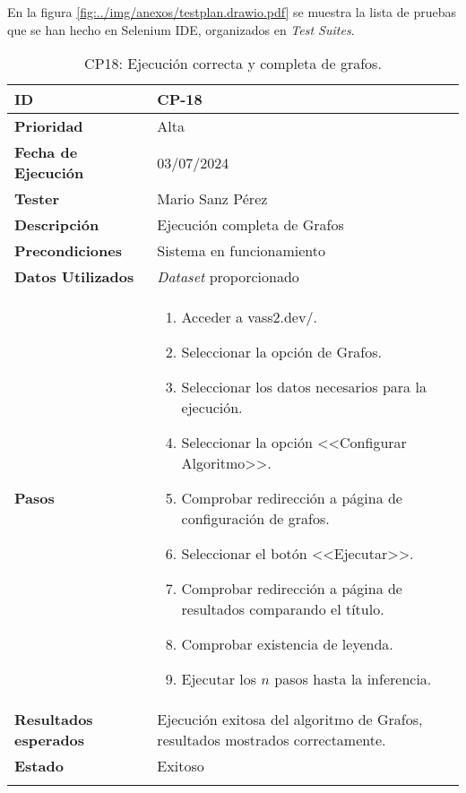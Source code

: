 En la figura \ref{fig:../img/anexos/testplan.drawio.pdf} se muestra la lista de pruebas que se han hecho en Selenium IDE, organizados en \textit{Test Suites}.


\begin{longtable}{>{\raggedright\arraybackslash}p{4cm} p{9.5cm}}
    \hline
    \rowcolor{gray!20}
    \textbf{ID} & CP-18\\
    \hline
    \rowcolor{white}
    \textbf{Prioridad} & Alta \\
    \hline
    \rowcolor{gray!20}
    \textbf{Fecha de Ejecución} & 03/07/2024 \\
    \hline
    \rowcolor{white}
    \textbf{Tester} & Mario Sanz Pérez \\
    \hline
    \rowcolor{gray!20}
    \textbf{Descripción} & Ejecución completa de Grafos\\
    \hline
    \rowcolor{white}
    \textbf{Precondiciones} & Sistema en funcionamiento\\
    \hline
    \rowcolor{white}
    \textbf{Datos Utilizados} & \textit{Dataset} proporcionado\\
    \hline
    \rowcolor{gray!20}
    \textbf{Pasos} & \begin{enumerate}
        \item Acceder a vass2.dev/.
        \item Seleccionar la opción de Grafos.
        \item Seleccionar los datos necesarios para la ejecución.
        \item Seleccionar la opción <<Configurar Algoritmo>>.
        \item Comprobar redirección a página de configuración de grafos.
        \item Seleccionar el botón <<Ejecutar>>.
        \item Comprobar redirección a página de resultados comparando el título.
        \item Comprobar existencia de leyenda.
        \item Ejecutar los $n$ pasos hasta la inferencia.
    \end{enumerate}\\
	\hline
    \rowcolor{gray!20}
    \textbf{Resultados esperados} & Ejecución exitosa del algoritmo de Grafos, resultados mostrados correctamente.\\
    \hline
    \rowcolor{white}
    \textbf{Estado} & Exitoso\\
    \hline
	\caption[CP18: Ejecución Grafos]{CP18: Ejecución correcta y completa de grafos.}
\end{longtable}

